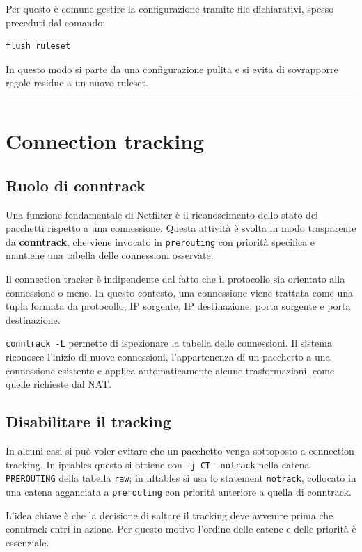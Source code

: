 \documentclass[12pt, a4paper]{report}
\begin{document}
Per questo è comune gestire la configurazione tramite file dichiarativi, spesso preceduti dal comando:
\begin{lstlisting}[language=bash]
	flush ruleset
\end{lstlisting}
In questo modo si parte da una configurazione pulita e si evita di sovrapporre regole residue a un nuovo ruleset.

\noindent\rule{\textwidth}{0.4pt}

\section{Connection tracking}

\subsection{Ruolo di conntrack}
Una funzione fondamentale di Netfilter è il riconoscimento dello stato dei pacchetti rispetto a una connessione. Questa attività è svolta in modo trasparente da \textbf{conntrack}, che viene invocato in \texttt{prerouting} con priorità specifica e mantiene una tabella delle connessioni osservate.

Il connection tracker è indipendente dal fatto che il protocollo sia orientato alla connessione o meno. In questo contesto, una connessione viene trattata come una tupla formata da protocollo, IP sorgente, IP destinazione, porta sorgente e porta destinazione.

\texttt{conntrack -L} permette di ispezionare la tabella delle connessioni. Il sistema riconosce l'inizio di nuove connessioni, l'appartenenza di un pacchetto a una connessione esistente e applica automaticamente alcune trasformazioni, come quelle richieste dal NAT.

\subsection{Disabilitare il tracking}
In alcuni casi si può voler evitare che un pacchetto venga sottoposto a connection tracking. In iptables questo si ottiene con \texttt{-j CT --notrack} nella catena \texttt{PREROUTING} della tabella \texttt{raw}; in nftables si usa lo statement \texttt{notrack}, collocato in una catena agganciata a \texttt{prerouting} con priorità anteriore a quella di conntrack.

L'idea chiave è che la decisione di saltare il tracking deve avvenire prima che conntrack entri in azione. Per questo motivo l'ordine delle catene e delle priorità è essenziale.
\end{document}
